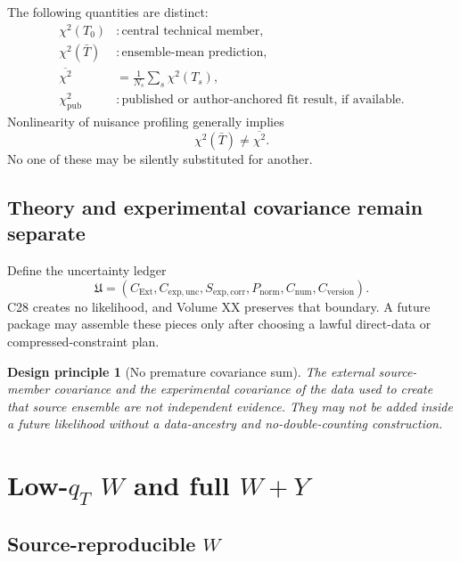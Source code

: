 \documentclass[11pt]{article}
\newtheorem{principle}[definition]{Design principle}
\newcommand{\Ext}{\ensuremath{\mathrm{Ext}}}
\begin{document}
The following quantities are distinct:
\begin{align}
 \chi^2(T_0) &: \text{central technical member},\\
 \chi^2(\bar T) &: \text{ensemble-mean prediction},\\
 \overline{\chi^2}
 &=\frac1{N_s}\sum_s\chi^2(T_s),\\
 \chi^2_{\mathrm{pub}} &: \text{published or author-anchored fit result, if available}.
 \label{eq:chi2-objects}
\end{align}
Nonlinearity of nuisance profiling generally implies
\begin{equation}
 \chi^2(\bar T)\neq\overline{\chi^2}.
 \label{eq:chi2-nonlinearity}
\end{equation}
No one of these may be silently substituted for another.

\subsection{Theory and experimental covariance remain separate}

Define the uncertainty ledger
\begin{equation}
 \mathfrak U
 =
 \left(
 C_{\Ext},
 C_{\mathrm{exp,unc}},
 S_{\mathrm{exp,corr}},
 P_{\mathrm{norm}},
 C_{\mathrm{num}},
 C_{\mathrm{version}}
 \right).
 \label{eq:uncertainty-ledger}
\end{equation}
C28 creates no likelihood, and Volume XX preserves that boundary.  A future package may assemble these pieces only after choosing a lawful direct-data or compressed-constraint plan.

\begin{principle}[No premature covariance sum]
The external source-member covariance and the experimental covariance of the data used to create that source ensemble are not independent evidence.  They may not be added inside a future likelihood without a data-ancestry and no-double-counting construction.
\end{principle}

\section{Low-\texorpdfstring{\(q_T\)}{qT} \texorpdfstring{\(W\)}{W} and full \texorpdfstring{\(W+Y\)}{W+Y}}
\label{sec:wy}

\subsection{Source-reproducible \texorpdfstring{\(W\)}{W}}
\end{document}
